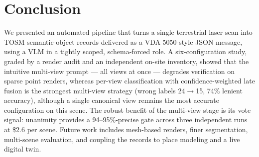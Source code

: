 \documentclass[conference]{IEEEtran}
\begin{document}
\section{Conclusion}
We presented an automated pipeline that turns a single terrestrial laser
scan into TOSM semantic-object records delivered as a VDA 5050-style JSON
message, using a VLM in a tightly scoped, schema-forced role. A
six-configuration study, graded by a render audit and an independent
on-site inventory, showed that the intuitive multi-view prompt --- all
views at once --- degrades verification on sparse point renders, whereas
per-view classification with confidence-weighted late fusion is the
strongest multi-view strategy (wrong labels 24$\rightarrow$15, 74\%
lenient accuracy), although a single canonical view remains the most
accurate configuration on this scene. The robust benefit of the
multi-view stage is its vote signal: unanimity provides a 94--95\%-precise
gate across three independent runs at \$2.6 per scene. Future work
includes mesh-based renders, finer segmentation, multi-scene evaluation,
and coupling the records to place modeling and a live digital twin.
\end{document}
